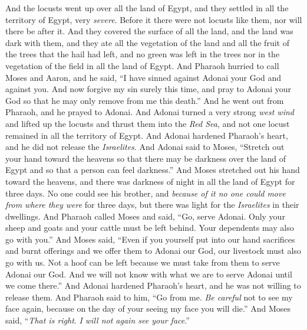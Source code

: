 \begin{biblechapter}
\verse And the locusts went up over all the land of Egypt, and they settled in all the territory of Egypt, very \textit{severe}. Before it there were not locusts like them, nor will there be after it.
\verse And they covered the surface of all the land, and the land was dark with them, and they ate all the vegetation of the land and all the fruit of the trees that the hail had left, and no green was left in the trees nor in the vegetation of the field in all the land of Egypt.
\verse And Pharaoh hurried to call Moses and Aaron, and he said, “I have sinned against Adonai your God and against you.
\verse And now forgive my sin surely this time, and pray to Adonai your God so that he may only remove from me this death.”
\verse And he went out from Pharaoh, and he prayed to Adonai.
\verse And Adonai turned a very strong \textit{west wind} and lifted up the locusts and thrust them into the \textit{Red Sea}, and not one locust remained in all the territory of Egypt.
\verse And Adonai hardened Pharaoh’s heart, and he did not release the \textit{Israelites}.
 And Adonai said to Moses, “Stretch out your hand toward the heavens so that there may be darkness over the land of Egypt and so that a person can feel darkness.”
\verse And Moses stretched out his hand toward the heavens, and there was darkness of night in all the land of Egypt for three days.
\verse No one could see his brother, and \textit{because of it no one could move from where they were} for three days, but there was light for the \textit{Israelites} in their dwellings.
\verse And Pharaoh called Moses and said, “Go, serve Adonai. Only your sheep and goats and your cattle must be left behind. Your dependents may also go with you.”
\verse And Moses said, “Even if you yourself put into our hand sacrifices and burnt offerings and we offer them to Adonai our God,
\verse our livestock must also go with us. Not a hoof can be left because we must take from them to serve Adonai our God. And we will not know with what we are to serve Adonai until we come there.”
\verse And Adonai hardened Pharaoh’s heart, and he was not willing to release them.
\verse And Pharaoh said to him, “Go from me. \textit{Be careful} not to see my face again, because on the day of your seeing my face you will die.”
\verse And Moses said, “\textit{That is right}. \textit{I will not again see your face}.”
\end{biblechapter}

